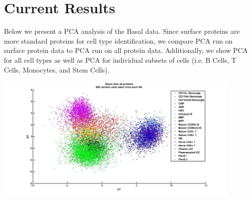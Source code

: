 \documentclass{article} %
\makeatletter
\def\step{%
   \@ifnextchar[ \@step{\@noitemargtrue\@step[\@itemlabel]}}
\def\@step[#1]{\item[#1]\mbox{}\\\hspace*{\dimexpr-\labelwidth-\labelsep}}
\makeatother
\begin{document}
\section{Current Results}
Below we present a PCA analysis of the Basal data. Since surface proteins are more standard proteins for cell type identification, we compare PCA run on surface protein data to PCA run on all protein data. Additionally, we show PCA for all cell types as well as PCA for individual subsets of cells (i.e. B Cells, T Cells, Monocytes, and Stem Cells).

\begin{minipage}{\linewidth}
\centering
  \includegraphics[width=120mm]{Basal_AllProtein_AllCells.jpg}
\end{minipage}
\end{document}
